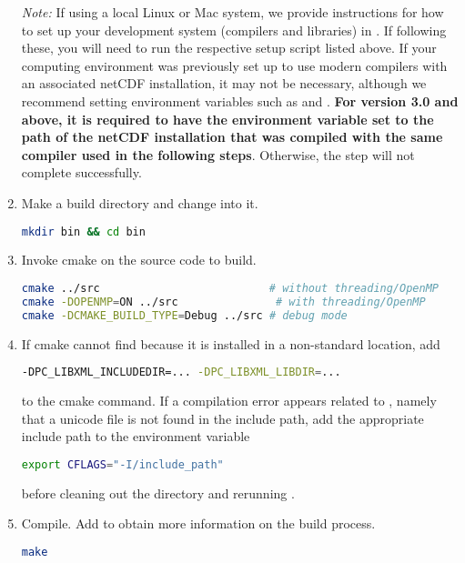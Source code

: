 \begin{enumerate}
\emph{Note:} If using a local Linux or Mac system, we provide instructions for how to set up your development system (compilers and libraries) in . If following these, you will need to run the respective setup script listed above. If your computing environment was previously set up to use modern compilers with an associated netCDF installation, it may not be necessary, although we recommend setting environment variables such as  and . \textbf{For version 3.0 and above, it is required to have the  environment variable set to the path of the netCDF installation that was compiled with the same compiler used in the following steps}. Otherwise, the  step will not complete successfully.

    \item Make a build directory and change into it.
\begin{lstlisting}[language=bash]
mkdir bin && cd bin
\end{lstlisting}
    \item Invoke cmake on the source code to build.
\begin{lstlisting}[language=bash]
cmake ../src                          # without threading/OpenMP
cmake -DOPENMP=ON ../src               # with threading/OpenMP
cmake -DCMAKE_BUILD_TYPE=Debug ../src # debug mode
\end{lstlisting}
    \item If cmake cannot find  because it is installed in a non-standard location, add
\begin{lstlisting}[language=bash]
-DPC_LIBXML_INCLUDEDIR=... -DPC_LIBXML_LIBDIR=...
\end{lstlisting}
    to the cmake command. If a compilation error appears related to , namely that a unicode file is not found in the include path, add the appropriate include path to the  environment variable
\begin{lstlisting}[language=bash]
export CFLAGS="-I/include_path"
\end{lstlisting} before cleaning out the  directory and rerunning .
    \item Compile. Add  to obtain more information on the build process.
\begin{lstlisting}[language=bash]
make
\end{lstlisting}
\end{enumerate}

